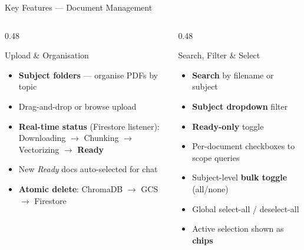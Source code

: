\documentclass[aspectratio=169]{beamer}
\begin{document}
\begin{frame}[t,shrink=3]{Key Features — Document Management}
  \begin{columns}[t]
    \begin{column}{0.48\textwidth}
      \begin{block}{Upload \& Organisation}
        \begin{itemize}\setlength\itemsep{0.2em}
          \item \textbf{Subject folders} — organise PDFs by topic
          \item Drag-and-drop or browse upload
          \item \textbf{Real-time status} (Firestore listener):\\
                Downloading $\to$ Chunking $\to$ Vectorizing $\to$ \textbf{Ready}
          \item New \textit{Ready} docs auto-selected for chat
          \item \textbf{Atomic delete}: ChromaDB $\to$ GCS $\to$ Firestore
        \end{itemize}
      \end{block}
    \end{column}
    \begin{column}{0.48\textwidth}
      \begin{block}{Search, Filter \& Select}
        \begin{itemize}\setlength\itemsep{0.2em}
          \item \textbf{Search} by filename or subject
          \item \textbf{Subject dropdown} filter
          \item \textbf{Ready-only} toggle
          \item Per-document checkboxes to scope queries
          \item Subject-level \textbf{bulk toggle} (all/none)
          \item Global select-all / deselect-all
          \item Active selection shown as \textbf{chips}
        \end{itemize}
      \end{block}
    \end{column}
  \end{columns}
\end{frame}
\end{document}
